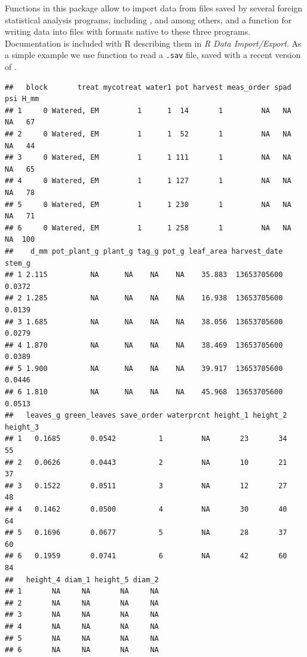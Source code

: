 \documentclass[krantz2]{krantz}\usepackage{knitr}%
\begin{document}
Functions in this package allow to import data from files saved by several foreign statistical analysis programs, including ,  and  among others, and a function for writing data into files with formats native to these three programs. Documentation is included with R describing them in \emph{R Data Import/Export}. As a simple example we use function  to read a \texttt{.sav} file, saved with a recent version of .

\begin{knitrout}\footnotesize
{}\color{fgcolor}\begin{kframe}
\begin{alltt}
 \hlkwb{<-} \hlstd{(} \hlstd{=} \hlstd{,}  \hlstd{=} \hlstd{)}
\end{alltt}


{\ttfamily\noindent\itshape\color{messagecolor}{\#\# re-encoding from UTF-8}}\begin{alltt}
\end{alltt}
\begin{verbatim}
##   block       treat mycotreat water1 pot harvest meas_order spad psi H_mm
## 1     0 Watered, EM         1      1  14       1         NA   NA  NA   67
## 2     0 Watered, EM         1      1  52       1         NA   NA  NA   44
## 3     0 Watered, EM         1      1 111       1         NA   NA  NA   65
## 4     0 Watered, EM         1      1 127       1         NA   NA  NA   78
## 5     0 Watered, EM         1      1 230       1         NA   NA  NA   71
## 6     0 Watered, EM         1      1 258       1         NA   NA  NA  100
##    d_mm pot_plant_g plant_g tag_g pot_g leaf_area harvest_date stem_g
## 1 2.115          NA      NA    NA    NA    35.883  13653705600 0.0372
## 2 1.285          NA      NA    NA    NA    16.938  13653705600 0.0139
## 3 1.685          NA      NA    NA    NA    38.056  13653705600 0.0279
## 4 1.870          NA      NA    NA    NA    38.469  13653705600 0.0389
## 5 1.900          NA      NA    NA    NA    39.917  13653705600 0.0446
## 6 1.810          NA      NA    NA    NA    45.968  13653705600 0.0513
##   leaves_g green_leaves save_order waterprcnt height_1 height_2 height_3
## 1   0.1685       0.0542          1         NA       23       34       55
## 2   0.0626       0.0443          2         NA       10       21       37
## 3   0.1522       0.0511          3         NA       12       27       48
## 4   0.1462       0.0500          4         NA       30       40       64
## 5   0.1696       0.0677          5         NA       28       37       60
## 6   0.1959       0.0741          6         NA       42       60       84
##   height_4 diam_1 height_5 diam_2
## 1       NA     NA       NA     NA
## 2       NA     NA       NA     NA
## 3       NA     NA       NA     NA
## 4       NA     NA       NA     NA
## 5       NA     NA       NA     NA
## 6       NA     NA       NA     NA
\end{verbatim}
\end{kframe}
\end{knitrout}
\end{document}
